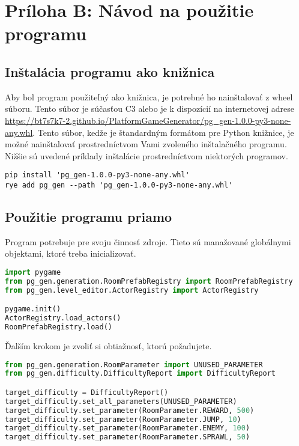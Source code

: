 \section*{Príloha B: Návod na použitie programu}

\subsection*{Inštalácia programu ako knižnica}

Aby bol program použiteľný ako knižnica, je potrebné ho nainštalovať z wheel súboru. Tento súbor je súčasťou C3 alebo je k dispozícií na internetovej adrese \url{https://bt7s7k7-2.github.io/PlatformGameGenerator/pg_gen-1.0.0-py3-none-any.whl}. Tento súbor, kedže je štandardným formátom pre Python knižnice, je možné nainštalovať prostredníctvom Vami zvoleného inštalačného programu. Nižšie sú uvedené príklady inštalácie prostredníctvom niektorých programov.

\begin{lstlisting}
pip install 'pg_gen-1.0.0-py3-none-any.whl'
rye add pg_gen --path 'pg_gen-1.0.0-py3-none-any.whl'
\end{lstlisting}


\subsection*{Použitie programu priamo}

Program potrebuje pre svoju činnosť zdroje. Tieto sú manažované globálnymi objektami, ktoré treba inicializovať.

\begin{lstlisting}[language=python]
import pygame
from pg_gen.generation.RoomPrefabRegistry import RoomPrefabRegistry
from pg_gen.level_editor.ActorRegistry import ActorRegistry

pygame.init()
ActorRegistry.load_actors()
RoomPrefabRegistry.load()
\end{lstlisting}

Ďalším krokom je zvoliť si obtiažnosť, ktorú požadujete.

\begin{lstlisting}[language=python]
from pg_gen.generation.RoomParameter import UNUSED_PARAMETER
from pg_gen.difficulty.DifficultyReport import DifficultyReport

target_difficulty = DifficultyReport()
target_difficulty.set_all_parameters(UNUSED_PARAMETER)
target_difficulty.set_parameter(RoomParameter.REWARD, 500)
target_difficulty.set_parameter(RoomParameter.JUMP, 10)
target_difficulty.set_parameter(RoomParameter.ENEMY, 100)
target_difficulty.set_parameter(RoomParameter.SPRAWL, 50)
\end{lstlisting}



